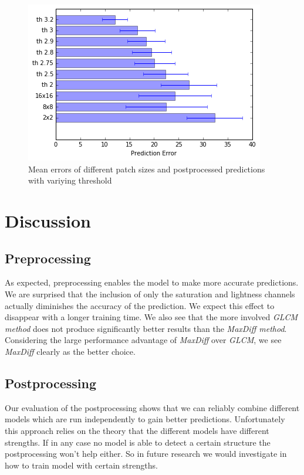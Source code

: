 \documentclass[10pt,conference,compsocconf]{IEEEtran}
\begin{document}
\begin{figure}
	\centering
	\includegraphics[width=.8\columnwidth]{pictures/postprocessing}
	\caption{Mean errors of different patch sizes and postprocessed predictions with variying threshold}
	\label{fig:postprocessing}
\end{figure}


\section{Discussion}

\subsection{Preprocessing}

As expected, preprocessing enables the model to make more accurate predictions.
We are surprised that the inclusion of only the saturation and lightness channels actually diminishes the accuracy of the prediction.
We expect this effect to disappear with a longer training time.
We also see that the more involved \emph{GLCM method} does not produce significantly better results than the \emph{MaxDiff method}.
Considering the large performance advantage of \emph{MaxDiff} over \emph{GLCM}, we see \emph{MaxDiff} clearly as the better choice.

\subsection{Postprocessing}

Our evaluation of the postprocessing shows that we can reliably combine different models which are run independently to gain better predictions. Unfortunately this approach relies on the theory that the different models have different strengths. If in any case no model is able to detect a certain structure the postprocessing won't help either. So in future research we would investigate in how to train model with certain strengths.
\end{document}
